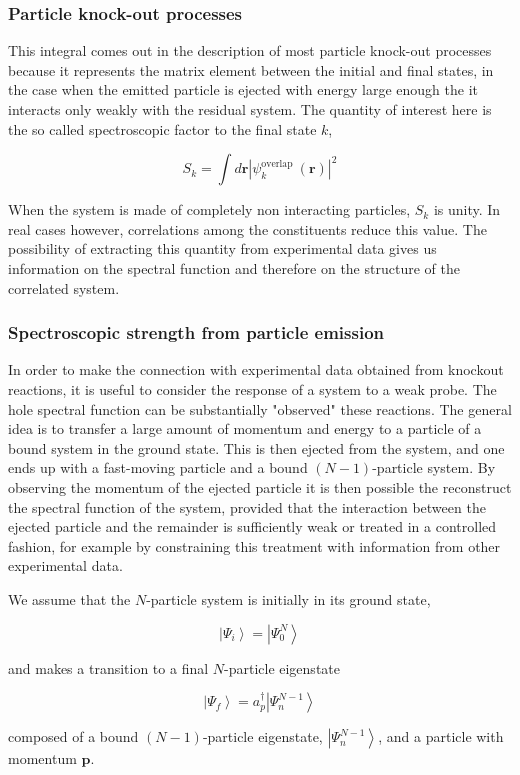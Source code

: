 \documentclass[compress]{beamer}
\begin{document}
{
\frametitle{Particle knock-out processes}
\begin{small}
{\scriptsize

This integral comes out in the description of most
particle knock-out processes because it represents the matrix element
between the initial and final states, in the case when the emitted
particle is ejected with energy large enough the it interacts only
weakly with the residual system. The quantity of interest here is the
so called spectroscopic factor to the final state $k$,

$$
S_{k}=\int d \mathbf{r}\left|\psi_{k}^{\text {overlap }}(\mathbf{r})\right|^{2}
$$

When the system is made of completely non interacting particles,
$S_{k}$ is unity. In real cases however, correlations among the
constituents reduce this value. The possibility of extracting this
quantity from experimental data gives us information on the spectral
function and therefore on the structure of the correlated system.

}
\end{small}
}
\frame
{
\frametitle{Spectroscopic strength from particle emission}
\begin{small}
{\scriptsize
In order to make the connection with experimental data obtained from
knockout reactions, it is useful to consider the response of a system
to a weak probe. The hole spectral function
can be substantially "observed" these reactions. The general idea is
to transfer a large amount of momentum and energy to a particle of a
bound system in the ground state. This is then ejected from the
system, and one ends up with a fast-moving particle and a bound
$(N-1)$-particle system. By observing the momentum of the ejected
particle it is then possible the reconstruct the spectral function of
the system, provided that the interaction between the ejected particle
and the remainder is sufficiently weak or treated in a controlled
fashion, for example by constraining this treatment with information from
other experimental data.

We assume that the $N$-particle system is initially in its ground state,

$$
\left|\Psi_{i}\right\rangle=\left|\Psi_{0}^{N}\right\rangle
$$

and makes a transition to a final $N$-particle eigenstate

$$
\left|\Psi_{f}\right\rangle=a_{p}^{\dagger}\left|\Psi_{n}^{N-1}\right\rangle
$$

composed of a bound $(N-1)$-particle eigenstate, $\left|\Psi_{n}^{N-1}\right\rangle$, and a particle with momentum $\boldsymbol{p}$.

}
\end{small}
}
\end{document}
